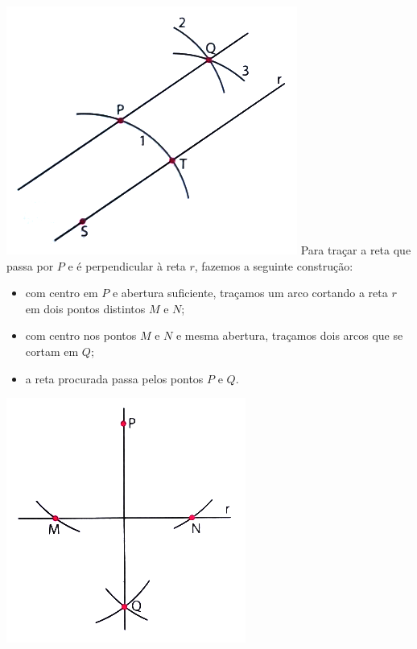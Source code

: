 \documentclass[a4paper,14pt]{article}
\begin{document}
\begin{multicols}{2}
		\includegraphics[width=1\linewidth]{6FMA70_imagens/imagem2}
		Para traçar a reta que passa por $P$ e é perpendicular à reta $r$, fazemos a seguinte construção:
		\begin{itemize}
			\item com centro em $P$ e abertura suficiente, traçamos um arco cortando a reta $r$ em dois pontos distintos $M$ e $N$;
			\item com centro nos pontos $M$ e $N$ e mesma abertura, traçamos dois arcos que se cortam em $Q$;
			\item a reta procurada passa pelos pontos $P$ e $Q$.
		\end{itemize}
		\includegraphics[width=1\linewidth]{6FMA70_imagens/imagem3}
	\end{multicols}
\end{document}
